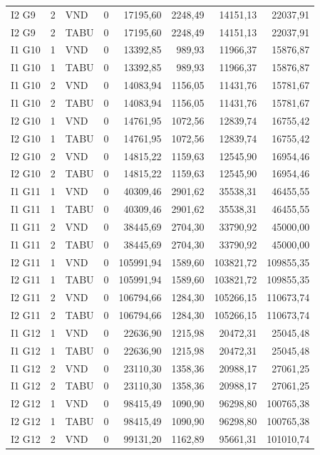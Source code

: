 \begin{longtable}{lrlrrrrr}
I2 G9 & 2 & VND & 0 & 17195,60 & 2248,49 & 14151,13 & 22037,91 \\
I2 G9 & 2 & TABU & 0 & 17195,60 & 2248,49 & 14151,13 & 22037,91 \\
I1 G10 & 1 & VND & 0 & 13392,85 & 989,93 & 11966,37 & 15876,87 \\
I1 G10 & 1 & TABU & 0 & 13392,85 & 989,93 & 11966,37 & 15876,87 \\
I1 G10 & 2 & VND & 0 & 14083,94 & 1156,05 & 11431,76 & 15781,67 \\
I1 G10 & 2 & TABU & 0 & 14083,94 & 1156,05 & 11431,76 & 15781,67 \\
I2 G10 & 1 & VND & 0 & 14761,95 & 1072,56 & 12839,74 & 16755,42 \\
I2 G10 & 1 & TABU & 0 & 14761,95 & 1072,56 & 12839,74 & 16755,42 \\
I2 G10 & 2 & VND & 0 & 14815,22 & 1159,63 & 12545,90 & 16954,46 \\
I2 G10 & 2 & TABU & 0 & 14815,22 & 1159,63 & 12545,90 & 16954,46 \\
I1 G11 & 1 & VND & 0 & 40309,46 & 2901,62 & 35538,31 & 46455,55 \\
I1 G11 & 1 & TABU & 0 & 40309,46 & 2901,62 & 35538,31 & 46455,55 \\
I1 G11 & 2 & VND & 0 & 38445,69 & 2704,30 & 33790,92 & 45000,00 \\
I1 G11 & 2 & TABU & 0 & 38445,69 & 2704,30 & 33790,92 & 45000,00 \\
I2 G11 & 1 & VND & 0 & 105991,94 & 1589,60 & 103821,72 & 109855,35 \\
I2 G11 & 1 & TABU & 0 & 105991,94 & 1589,60 & 103821,72 & 109855,35 \\
I2 G11 & 2 & VND & 0 & 106794,66 & 1284,30 & 105266,15 & 110673,74 \\
I2 G11 & 2 & TABU & 0 & 106794,66 & 1284,30 & 105266,15 & 110673,74 \\
I1 G12 & 1 & VND & 0 & 22636,90 & 1215,98 & 20472,31 & 25045,48 \\
I1 G12 & 1 & TABU & 0 & 22636,90 & 1215,98 & 20472,31 & 25045,48 \\
I1 G12 & 2 & VND & 0 & 23110,30 & 1358,36 & 20988,17 & 27061,25 \\
I1 G12 & 2 & TABU & 0 & 23110,30 & 1358,36 & 20988,17 & 27061,25 \\
I2 G12 & 1 & VND & 0 & 98415,49 & 1090,90 & 96298,80 & 100765,38 \\
I2 G12 & 1 & TABU & 0 & 98415,49 & 1090,90 & 96298,80 & 100765,38 \\
I2 G12 & 2 & VND & 0 & 99131,20 & 1162,89 & 95661,31 & 101010,74 \\

\end{longtable}
